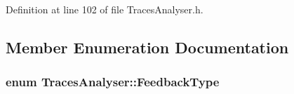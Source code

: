 Definition at line 102 of file Traces\+Analyser.\+h.



\subsection{Member Enumeration Documentation}
\subsubsection[{\texorpdfstring{Feedback\+Type}{FeedbackType}}]{\setlength{\rightskip}{0pt plus 5cm}enum {\bf Traces\+Analyser\+::\+Feedback\+Type}}\hypertarget{class_traces_analyser_a57be29ce5ac10ca51e56d8385b4a1820}{}\label{class_traces_analyser_a57be29ce5ac10ca51e56d8385b4a1820}
